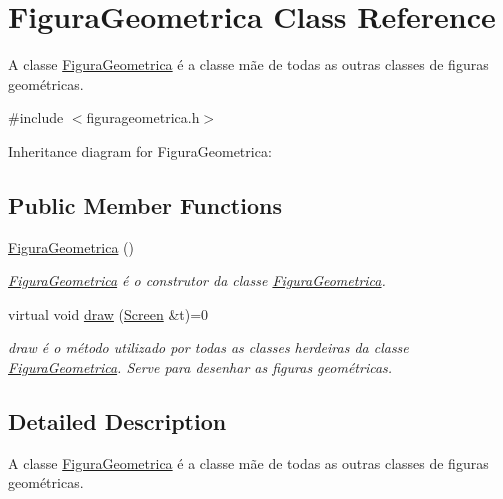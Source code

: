 \hypertarget{classFiguraGeometrica}{}\section{Figura\+Geometrica Class Reference}
\label{classFiguraGeometrica}


A classe \hyperlink{classFiguraGeometrica}{Figura\+Geometrica} é a classe mãe de todas as outras classes de figuras geométricas.  




{\ttfamily \#include $<$figurageometrica.\+h$>$}



Inheritance diagram for Figura\+Geometrica\+:
\subsection*{Public Member Functions}
\begin{DoxyCompactItemize}
\item 
\mbox{\label{classFiguraGeometrica_a81d7c7efaea511e60a15f5a363138dd9}} 
\hyperlink{classFiguraGeometrica_a81d7c7efaea511e60a15f5a363138dd9}{Figura\+Geometrica} ()
\begin{DoxyCompactList}\small\item\em \hyperlink{classFiguraGeometrica}{Figura\+Geometrica} é o construtor da classe \hyperlink{classFiguraGeometrica}{Figura\+Geometrica}. \end{DoxyCompactList}\item 
virtual void \hyperlink{classFiguraGeometrica_a8ee8dedc060b6059a805ea091aef2c41}{draw} (\hyperlink{classScreen}{Screen} \&t)=0
\begin{DoxyCompactList}\small\item\em draw é o método utilizado por todas as classes herdeiras da classe \hyperlink{classFiguraGeometrica}{Figura\+Geometrica}. Serve para desenhar as figuras geométricas. \end{DoxyCompactList}\end{DoxyCompactItemize}


\subsection{Detailed Description}
A classe \hyperlink{classFiguraGeometrica}{Figura\+Geometrica} é a classe mãe de todas as outras classes de figuras geométricas. 

